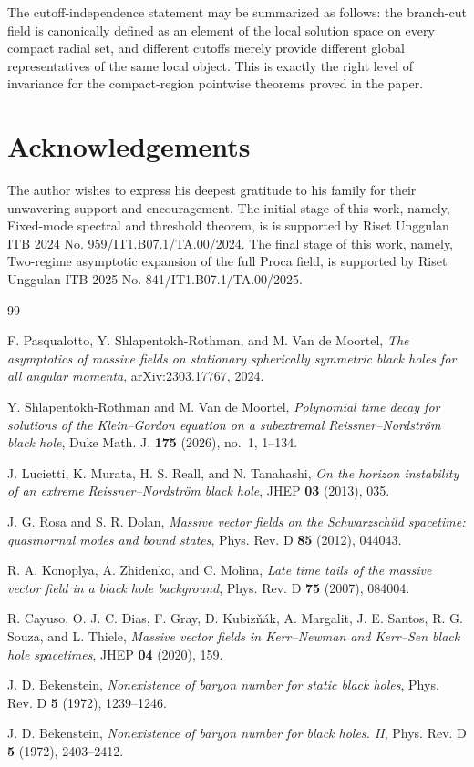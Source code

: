 \documentclass[12pt]{article}
\numberwithin{equation}{section}
\theoremstyle{plain}
\theoremstyle{definition}
\theoremstyle{remark}
\begin{document}
The cutoff-independence statement may be summarized as follows: the branch-cut field is canonically defined as an element of the local solution space on every compact radial set, and different cutoffs merely provide different global representatives of the same local object.  This is exactly the right level of invariance for the compact-region pointwise theorems proved in the paper.

\section*{Acknowledgements}
The author wishes to express his deepest gratitude to his family for their unwavering support and encouragement. The initial stage of this work, namely, Fixed-mode spectral and threshold theorem, is is  supported by Riset Unggulan ITB 2024 No. 959/IT1.B07.1/TA.00/2024. The final stage of this work, namely, Two-regime asymptotic expansion of the full Proca field, is  supported by Riset Unggulan ITB 2025 No. 841/IT1.B07.1/TA.00/2025.

\begin{thebibliography}{99}

F. Pasqualotto, Y. Shlapentokh-Rothman, and M. Van de Moortel,
\emph{The asymptotics of massive fields on stationary spherically symmetric black holes for all angular momenta},
arXiv:2303.17767, 2024.

Y. Shlapentokh-Rothman and M. Van de Moortel,
\emph{Polynomial time decay for solutions of the Klein--Gordon equation on a subextremal Reissner--Nordstr\"om black hole},
Duke Math. J. \textbf{175} (2026), no.~1, 1--134.

J. Lucietti, K. Murata, H. S. Reall, and N. Tanahashi,
\emph{On the horizon instability of an extreme Reissner--Nordstr\"om black hole},
JHEP \textbf{03} (2013), 035.

J. G. Rosa and S. R. Dolan,
\emph{Massive vector fields on the Schwarzschild spacetime: quasinormal modes and bound states},
Phys. Rev. D \textbf{85} (2012), 044043.

R. A. Konoplya, A. Zhidenko, and C. Molina,
\emph{Late time tails of the massive vector field in a black hole background},
Phys. Rev. D \textbf{75} (2007), 084004.

R. Cayuso, O. J. C. Dias, F. Gray, D. Kubiz\v{n}\'ak, A. Margalit, J. E. Santos, R. G. Souza, and L. Thiele,
\emph{Massive vector fields in Kerr--Newman and Kerr--Sen black hole spacetimes},
JHEP \textbf{04} (2020), 159.

J. D. Bekenstein,
\emph{Nonexistence of baryon number for static black holes},
Phys. Rev. D \textbf{5} (1972), 1239--1246.

J. D. Bekenstein,
\emph{Nonexistence of baryon number for black holes. II},
Phys. Rev. D \textbf{5} (1972), 2403--2412.

\end{thebibliography}
\end{document}
